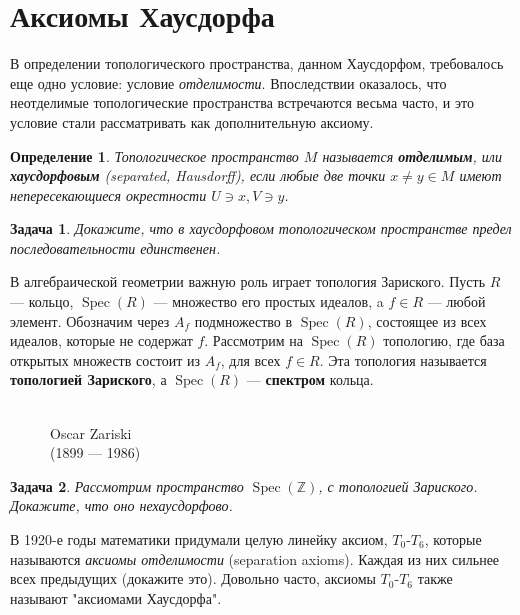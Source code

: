 \documentclass[12pt]{book}
\newcommand{\Spec}{\operatorname{Spec}}
\def\Z{{\mathbb Z}}
\theoremstyle{upshape}
\newtheorem{zadacha}{Задача}[chapter]
\theoremstyle{generic}
\newtheorem{opredelenie}[teorema]{Определение}
\newtheorem{remark}[teorema]{Замечание}
\def\замечание{\begin{remark}}
\def\еза{\end{remark}}
\theoremstyle{upshapenonumber}
\newcommand{\следствие}{%
     \refstepcounter{teorema}
     {\noindent\bf Следствие \thechapter.\arabic{teorema}:\ }}
\newcommand{\пример}{%
     \refstepcounter{teorema}
     {\noindent\bf Пример \thechapter.\arabic{teorema}:\ }}
\newcommand{\лемма}{%
     \refstepcounter{teorema}
     {\noindent\bf Лемма \thechapter.\arabic{teorema}:\ }}
\newcommand{\теорема}{%
     \refstepcounter{teorema}
     {\noindent\bf Теорема \thechapter.\arabic{teorema}:\ }}
\newcommand{\утверждение}{%
     \refstepcounter{teorema}
     {\noindent\bf Утверждение \thechapter.\arabic{teorema}:\ }}
\def\бф{\bf}
\def\ем{\em}
\def\задача{\begin{zadacha}}
\def\ез{\end{zadacha}}
\def\еу{\end{ukazanie}}
\def\определение{\begin{opredelenie}}
\def\ео{\end{opredelenie}}
\def\енум{\begin{enumerate}}
\def\ее{\end{enumerate}}
\begin{document}
\section{Аксиомы Хаусдорфа}

В определении топологического пространства, данном
Хаусдорфом, требовалось еще одно условие: условие
{\ем отделимости}. Впоследствии оказалось, что неотделимые
топологические пространства встречаются весьма часто,
и это условие стали рассматривать как дополнительную аксиому.

\определение
Топологическое пространство $M$ называется {\бф
отделимым}, или {\бф хаусдорфовым} (separated, Hausdorff),
если любые две точки $x\neq y \in M$ имеют
непересекающиеся окрестности $U\ni x, V \ni y$.
\ео

\задача
Докажите, что в хаусдорфовом топологическом
прост\-ранс\-тве предел последовательности единственен.
\ез

В алгебраической геометрии важную роль играет топология
Зариского. Пусть $R$ --- кольцо, $\Spec(R)$ --- множество
его простых идеалов, a $f \in R$ --- любой элемент. 
Обозначим через $A_f$ подмножество в  $\Spec(R)$,
состоящее из всех идеалов, которые не содержат $f$.
Рассмотрим на $\Spec(R)$ топологию, где
база открытых множеств состоит из $A_f$, для
всех $f\in R$. Эта топология называется 
{\бф топологией Зариского}, а $\Spec(R)$ --- 
{\бф спектром} кольца.

\begin{figure}[ht]
\begin{center}
\\
Oscar Zariski \\
(1899 --- 1986)
\end{center}
\end{figure}


\задача
Рассмотрим пространство $\Spec(\Z)$,
с топологией Зариского. Докажите, что оно нехаусдорфово.
\ез




В 1920-е годы математики придумали
целую линейку аксиом, $T_0$-$T_6$, которые называются
 {\ем аксиомы отделимости} (separation axioms). 
Каждая из них сильнее всех предыдущих (докажите это). 
Довольно часто, аксиомы $T_0$-$T_6$ также называют
"аксиомами Хаусдорфа". 
\end{document}
